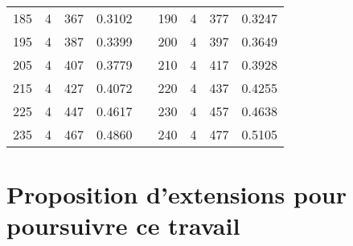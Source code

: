 \documentclass[a4paper, 12pt, french,oneside]{book}
\begin{document}
\begin{table}[!ht]
\begin{tabularx}{\linewidth}{|c|c|c|c|X|c|c|c|c|}
        185          & 4            & 367             & 0.3102                        &  &

        190          & 4            & 377             & 0.3247                                                                                                           \\

        195          & 4            & 387             & 0.3399                        &  &

        200          & 4            & 397             & 0.3649                                                                                                           \\

        205          & 4            & 407             & 0.3779                        &  &

        210          & 4            & 417             & 0.3928                                                                                                           \\

        215          & 4            & 427             & 0.4072                        &  &

        220          & 4            & 437             & 0.4255                                                                                                           \\

        225          & 4            & 447             & 0.4617                        &  &

        230          & 4            & 457             & 0.4638                                                                                                           \\

        235          & 4            & 467             & 0.4860                        &  &

        240          & 4            & 477             & 0.5105                                                                                                           \\
        \cline{1-4}\cline{6-9}
    \end{tabularx}
\end{table}


\chapter{Proposition d'extensions pour poursuivre ce travail}
\end{document}
